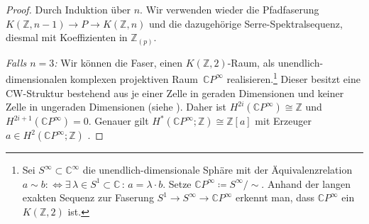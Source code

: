 \documentclass[11pt, a4paper, german]{article}
\theoremstyle{definition}
\theoremstyle{remark}
\newcommand{\Z}{\mathbb{Z}} %
\newcommand{\C}{\mathbb{C}} %
\begin{document}
\begin{proof}
  Durch Induktion über $n$.
  Wir verwenden wieder die Pfadfaserung $K(\Z, n-1) \to P \to K(\Z, n)$ und die dazugehörige Serre-Spektralsequenz, diesmal mit Koeffizienten in $\Z_{(p)}$.
  
  \emph{Falls $n = 3$:} \enspace
  Wir können die Faser, einen $K(\Z, 2)$-Raum, als unendlich-dimensionalen komplexen projektiven Raum~$\C P^\infty$ realisieren.\footnote{Sei $S^\infty \subset \C^\infty$ die unendlich-dimensionale Sphäre mit der Äquivalenzrelation $a \sim b :\!\iff \exists \, \lambda \in S^1 \subset \C \,:\, a = \lambda \cdot b$. Setze $\C P^\infty \coloneqq S^\infty / {\sim}$. Anhand der langen exakten Sequenz zur Faserung $S^1 \to S^\infty \to \C P^\infty$ erkennt man, dass $\C P^\infty$ ein $K(\Z, 2)$ ist.}
  Dieser besitzt eine CW-Struktur bestehend aus je einer Zelle in geraden Dimensionen und keiner Zelle in ungeraden Dimensionen (siehe \cite[\mbox{} Bsp 0.6]{hatcher:at}).
  Daher ist $H^{2i}(\C P^\infty) \cong \Z$ und $H^{2i+1}(\C P^\infty) = 0$.
  Genauer gilt $H^*(\C P^\infty; \Z) \cong \Z[a]$ mit Erzeuger $a \in H^2(\C P^\infty; \Z)$ \cite[\mbox{} Thm 3.12]{hatcher:at}.


\end{proof}
\end{document}
